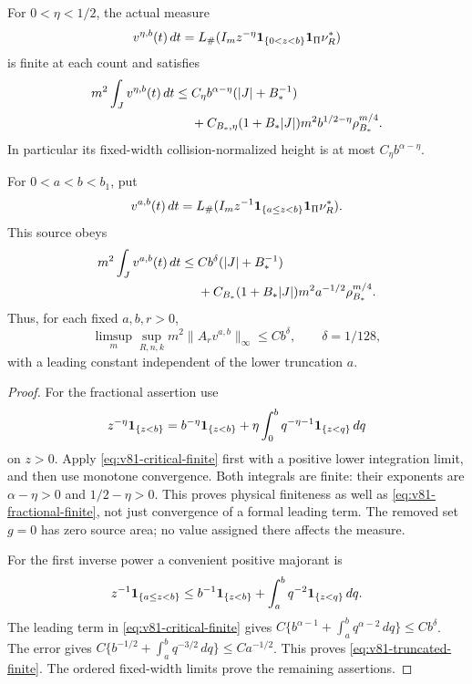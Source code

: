 \begin{theorem}
\label{thm:v81-gradient-insertions}
For $0<\eta<1/2$, the actual measure
\begin{equation}\label{eq:v81-fractional-source}
 v^{\eta,b}(t)\,dt
   =L_\#(I_m z^{-\eta}\one_{\{0<z<b\}}\one_\Pi\nu_R^*)
\end{equation}
is finite at each count and satisfies
\begin{align}
 m^2\int_Jv^{\eta,b}(t)\,dt
 \le{}&C_\eta b^{\alpha-\eta}(|J|+B_*^{-1})\notag\\
 &+C_{B_*,\eta}(1+B_*|J|)m^2
                 b^{1/2-\eta}\rho_{B_*}^{m/4}.
                                      \label{eq:v81-fractional-finite}
\end{align}
In particular its fixed-width collision-normalized height is at
most $C_\eta b^{\alpha-\eta}$.

For $0<a<b<b_1$, put
\begin{equation}\label{eq:v81-truncated-source}
 v^{a,b}(t)\,dt
   =L_\#(I_m z^{-1}\one_{\{a\le z<b\}}\one_\Pi\nu_R^*).
\end{equation}
This source obeys
\begin{align}
 m^2\int_Jv^{a,b}(t)\,dt
 \le{}&Cb^\delta(|J|+B_*^{-1})\notag\\
 &+C_{B_*}(1+B_*|J|)m^2 a^{-1/2}\rho_{B_*}^{m/4}.
                                      \label{eq:v81-truncated-finite}
\end{align}
Thus, for each fixed $a,b,r>0$,
\begin{equation}\label{eq:v81-truncated-average}
 \limsup_m\sup_{R,n,k}m^2\|A_rv^{a,b}\|_\infty\le Cb^\delta,
 \qquad \delta=1/128,
\end{equation}
with a leading constant independent of the lower truncation $a$.
\end{theorem}
\begin{proof}
For the fractional assertion use
\[
 z^{-\eta}\mathbf1_{\{z<b\}}
   =b^{-\eta}\mathbf1_{\{z<b\}}
       +\eta\int_0^b q^{-\eta-1}\mathbf1_{\{z<q\}}\,dq
\]
on $z>0$. Apply \eqref{eq:v81-critical-finite} first with a positive
lower integration limit, and then use monotone convergence. Both
integrals are finite: their exponents are $\alpha-\eta>0$ and
$1/2-\eta>0$. This proves physical finiteness as well as
\eqref{eq:v81-fractional-finite}, not just convergence of a
formal leading term. The removed set $g=0$ has zero source area;
no value assigned there affects the measure.

For the first inverse power a convenient positive majorant is
\[
 z^{-1}\mathbf1_{\{a\le z<b\}}
 \le b^{-1}\mathbf1_{\{z<b\}}+
                    \int_a^b q^{-2}\mathbf1_{\{z<q\}}\,dq.
\]
The leading term in \eqref{eq:v81-critical-finite} gives
$C\{b^{\alpha-1}+\int_a^b q^{\alpha-2}\,dq\}\le Cb^\delta$.
The error gives
$C\{b^{-1/2}+\int_a^b q^{-3/2}\,dq\}\le Ca^{-1/2}$.
This proves \eqref{eq:v81-truncated-finite}. The ordered fixed-width
limits prove the remaining assertions.
\end{proof}

